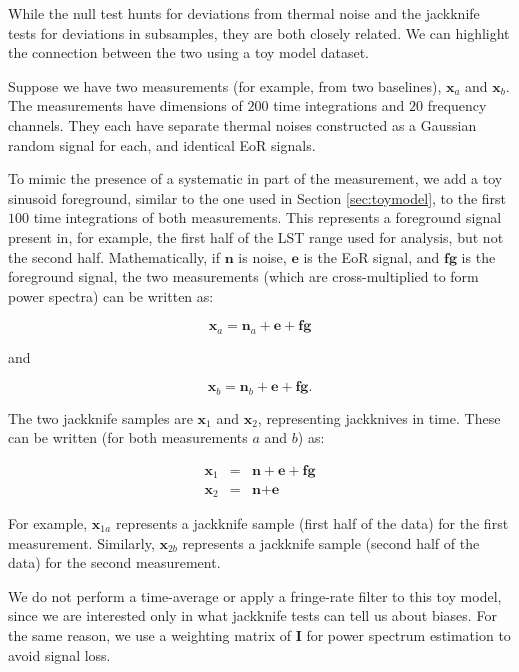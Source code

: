 \documentclass[preprint2,numberedappendix,tighten]{aastex6}  %
\begin{document}
While the null test hunts for deviations from thermal noise and the jackknife tests for deviations in subsamples, they are both 
closely related. We can highlight the connection between the two using a toy model dataset.

Suppose we have two measurements (for example, from two baselines), $\textbf{x}_{a}$ and $\textbf{x}_{b}$. The 
measurements have dimensions of $200$ time integrations and $20$ frequency channels. They each have separate thermal 
noises constructed as a Gaussian random signal for each, and identical EoR signals. 

To mimic the presence of a systematic in part of the measurement, we add a toy sinusoid foreground, similar to the one used in 
Section \ref{sec:toymodel}, to the first $100$ time integrations of both measurements. This represents a foreground signal 
present in, for example, the first half of the LST range used for analysis, but not the second half. Mathematically, if  $\textbf{n}$ 
is noise, $\textbf{e}$ is the EoR signal, and $\textbf{fg}$ is the foreground signal, the two measurements (which are cross-multiplied to form power spectra) can be written as:

\begin{equation}
\label{eq:bias1}
\textbf{x}_{a} = \textbf{n}_{a} + \textbf{e} + \textbf{fg}
\end{equation} 

\noindent and 

\begin{equation}
\label{eq:bias2}
\textbf{x}_{b} = \textbf{n}_{b} + \textbf{e} + \textbf{fg}.
\end{equation}

\noindent The two jackknife samples are $\textbf{x}_{1}$ and $\textbf{x}_{2}$, representing jackknives in time. These can be 
written (for both measurements $a$ and $b$) as:

\begin{eqnarray}
\textbf{x}_{1} &=& \textbf{n} + \textbf{e} + \textbf{fg} \\
\textbf{x}_{2} &=& \textbf{n} + \textbf{e} 
\end{eqnarray}

\noindent For example, $\textbf{x}_{1a}$ represents a jackknife sample (first half of the data) for the first measurement. 
Similarly, $\textbf{x}_{2b}$ represents a jackknife sample (second half of the data) for the second measurement.

We do not perform a time-average or apply a fringe-rate filter to this toy model, since we are interested only in what jackknife 
tests can tell us about biases. For the same reason, we use a weighting matrix of $\textbf{I}$ for power spectrum estimation to 
avoid signal loss. 
\end{document}
